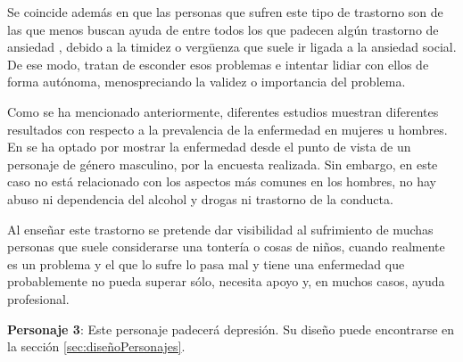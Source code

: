 \documentclass[12pt, a4paper,twoside,titlepage]{book}
\begin{document}
\begin{itemize}
{Se coincide además en que las personas que sufren este tipo de trastorno son de las que menos buscan ayuda de entre todos los que padecen algún trastorno de ansiedad \cite{articuloTAS2}, debido a la timidez o vergüenza que suele ir ligada a la ansiedad social. De ese modo, tratan de esconder esos problemas e intentar lidiar con ellos de forma autónoma, menospreciando la validez o importancia del problema. 

Como se ha mencionado anteriormente, diferentes estudios muestran diferentes resultados con respecto a la prevalencia de la enfermedad en mujeres u hombres. En  se ha optado por mostrar la enfermedad desde el punto de vista de un personaje de género masculino, por la encuesta realizada. Sin embargo, en este caso no está relacionado con los aspectos más comunes en los hombres, no hay abuso ni dependencia del alcohol y drogas ni trastorno de la conducta.  


Al enseñar este trastorno se pretende dar visibilidad al sufrimiento de muchas personas que suele considerarse una tontería o cosas de niños, cuando realmente es un problema y el que lo sufre lo pasa mal y tiene una enfermedad que probablemente no pueda superar sólo, necesita apoyo y, en muchos casos, ayuda profesional.
}
     
\end{itemize}




\textbf{Personaje 3}: Este personaje padecerá depresión. Su diseño puede encontrarse en la sección \ref{sec:diseñoPersonajes}.
\end{document}
